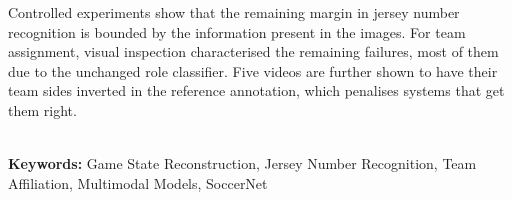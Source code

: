 Controlled experiments show that the remaining margin in jersey number recognition is bounded by the
information present in the images. For team assignment, visual inspection characterised the
remaining failures, most of them due to the unchanged role classifier. Five videos are further shown
to have their team sides inverted in the reference annotation, which penalises systems that get them
right.

\hspace{3cm}\\
\indent
\textbf{Keywords: } Game State Reconstruction, Jersey Number Recognition, Team Affiliation,
Multimodal Models, SoccerNet
